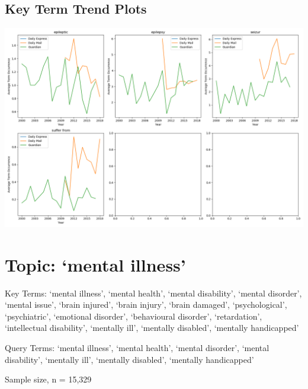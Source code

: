 \documentclass{report}
\begin{document}
\subsection{Key Term Trend Plots}
\includegraphics[width=\textwidth]{raw/epilepsy-terms.png}

\newpage
\section{Topic: `mental illness'}
Key Terms: `mental illness', `mental health', `mental disability', `mental disorder', `mental issue', `brain injured', `brain injury', `brain damaged', `psychological', `psychiatric', `emotional disorder', `behavioural disorder', `retardation', `intellectual disability', `mentally ill', `mentally disabled', `mentally handicapped'

\noindent Query Terms: `mental illness', `mental health', `mental disorder', `mental disability', `mentally ill', `mentally disabled', `mentally handicapped'

\noindent Sample size, n = 15,329
\end{document}
